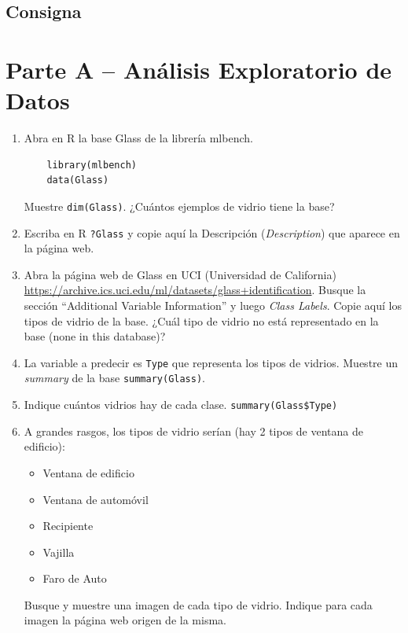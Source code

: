 %

%
%
\subsection{Consigna}

\section*{Parte A – Análisis Exploratorio de Datos}

\begin{enumerate}
    \item Abra en R la base Glass de la librería mlbench.
    \begin{verbatim}
    library(mlbench)
    data(Glass)
    \end{verbatim}
    Muestre \texttt{dim(Glass)}. ¿Cuántos ejemplos de vidrio tiene la base?
    
    \item Escriba en R \texttt{?Glass} y copie aquí la Descripción (\textit{Description}) que aparece en la página web.
    
    \item Abra la página web de Glass en UCI (Universidad de California) \url{https://archive.ics.uci.edu/ml/datasets/glass+identification}. Busque la sección “Additional Variable Information” y luego \textit{Class Labels}. Copie aquí los tipos de vidrio de la base. ¿Cuál tipo de vidrio no está representado en la base (none in this database)?
    
    \item La variable a predecir es \texttt{Type} que representa los tipos de vidrios. Muestre un \textit{summary} de la base \texttt{summary(Glass)}.
    
    \item Indique cuántos vidrios hay de cada clase. \texttt{summary(Glass\$Type)}
    
    \item A grandes rasgos, los tipos de vidrio serían (hay 2 tipos de ventana de edificio):
    \begin{itemize}
        \item Ventana de edificio
        \item Ventana de automóvil
        \item Recipiente
        \item Vajilla
        \item Faro de Auto
    \end{itemize}
    Busque y muestre una imagen de cada tipo de vidrio. Indique para cada
    imagen la página web origen de la misma.
    

\end{enumerate}
